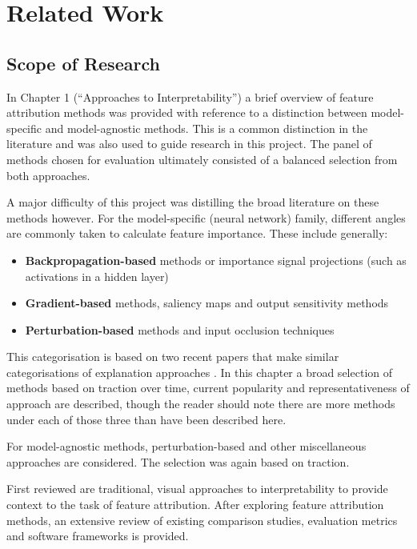 \documentclass[main]{subfiles}
\begin{document}
\chapter{Related Work}

\section{Scope of Research} \label{sec:scoperesearch}

In Chapter 1 (``Approaches to Interpretability'') a brief overview of feature attribution methods was provided with reference to a distinction between model-specific and model-agnostic methods. This is a common distinction in the literature and was also used to guide research in this project. The panel of methods chosen for evaluation ultimately consisted of a balanced selection from both approaches. 

A major difficulty of this project was distilling the broad literature on these methods however. For the model-specific (neural network) family, different angles are commonly taken to calculate feature importance. These include generally:
\begin{itemize}
\item \textbf{Backpropagation-based} methods or importance signal projections (such as activations in a hidden layer)
\item \textbf{Gradient-based} methods, saliency maps and output sensitivity methods
\item \textbf{Perturbation-based} methods and input occlusion techniques
\end{itemize}

This categorisation is based on two recent papers that make similar categorisations of explanation approaches  \cite{deeplift} \cite{patternnet}. In this chapter a broad selection of methods based on traction over time, current popularity and representativeness of approach are described, though the reader should note there are more methods under each of those three than have been described here.

For model-agnostic methods, perturbation-based and other miscellaneous approaches are considered. The selection was again based on traction.

First reviewed are traditional, visual approaches to interpretability to provide context to the task of feature attribution. After exploring feature attribution methods, an extensive review of existing comparison studies, evaluation metrics and software frameworks is provided.
\end{document}
